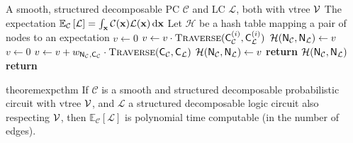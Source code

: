 \begin{algorithm}[t]
  \caption{\expc}\label{alg:expc}
  \begin{algorithmic}[1]
    \Require A smooth, structured decomposable PC $\mathcal{C}$ and LC $\mathcal{L}$, both with vtree
      $\operatorname{\mathcal{V}}$
      \Ensure The expectation $\mathbb{E}_\mathcal{C}\left[\mathcal{L}\right]=\int_{\mathbf{x}}\mathcal{C}(\mathbf{x})
      \mathcal{L}(\mathbf{x})\mathop{}\!\mathrm{d}\mathbf{x}$
    \State Let $\mathcal{H}$ be a hash table mapping a pair of nodes to an expectation
        \State $v\gets 0$
          \State $v\gets v\cdot\Call{Traverse}{\Child_\mathcal{C}^{(i)},\Child_\mathcal{L}^{(i)}}$
        \EndFor%
        \State $\mathcal{H}(\operatorname{\textup{\textsf{N}}}_\mathcal{C},\operatorname{\textup{\textsf{N}}}_\mathcal{L})\gets v$
      \EndNIElseIf%
        \State $v\gets 0$
            \State $v\gets v + w_{\Node_\mathcal{C},\Child_\mathcal{C}}\cdot\Call{Traverse}{\Child_\mathcal{C},\Child_\mathcal{L}}$
          \EndFor%
        \EndFor%
        \State $\mathcal{H}(\operatorname{\textup{\textsf{N}}}_\mathcal{C},\operatorname{\textup{\textsf{N}}}_\mathcal{L})\gets v$
      \EndNIElseIf
      \State \textbf{return} $\mathcal{H}(\operatorname{\textup{\textsf{N}}}_\mathcal{C},\operatorname{\textup{\textsf{N}}}_\mathcal{L})$
    \EndFunction%
    \State \textbf{return} 
  \end{algorithmic}
\end{algorithm}

\begin{restatable}{theorem}{expcthm}\label{thm:expc}
  If $\mathcal{C}$ is a smooth and structured decomposable probabilistic circuit with vtree
  $\operatorname{\mathcal{V}}$, and $\mathcal{L}$ a structured decomposable logic circuit also respecting $\operatorname{\mathcal{V}}$, then
  $\mathbb{E}_\mathcal{C}\left[\mathcal{L}\right]$ is polynomial time computable (in the number of
  edges).
\end{restatable}

